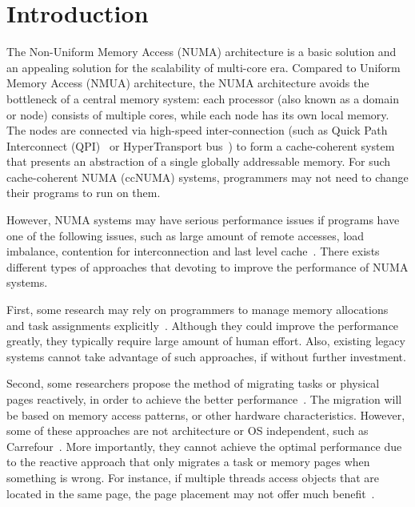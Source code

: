 
\section{Introduction}
\label{sec:intro}

The Non-Uniform Memory Access (NUMA) architecture is a basic solution and an appealing solution for the scalability of multi-core era. Compared to Uniform Memory Access (NMUA) architecture, the NUMA architecture avoids the bottleneck of a central memory system: each processor (also known as a domain or node) consists of multiple cores, while each node has its own local memory. The nodes are connected via high-speed inter-connection (such as Quick Path Interconnect (QPI)~\cite{intelqpi} or HyperTransport bus~\cite{hypertransport}) to form a cache-coherent system that presents an abstraction of a single globally addressable memory. For such cache-coherent NUMA (ccNUMA) systems, programmers may not need to change their programs to run on them. 

However, NUMA systems may have serious performance issues if programs have one of the following issues, such as large amount of remote accesses, load imbalance, contention for interconnection and last level cache~\cite{Blagodurov:2011:CNC:2002181.2002182, Dashti:2013:TMH:2451116.2451157}. There exists different types of approaches that devoting to improve the performance of NUMA systems. 

First, some research may rely on programmers to manage memory allocations and task assignments explicitly~\cite{Zhang:2015:NGA:2688500.2688507, Kaestle:2015:SSA:2813767.2813787, Lin:2016:MTP:2872362.2872401, Majo:2017:LPC:3057718.3040222}. Although they could improve the performance greatly, they typically require large amount of human effort. Also, existing legacy systems cannot take advantage of such approaches, if without further investment.  

Second, some researchers propose the method of migrating tasks or physical pages reactively, in order to achieve the better performance~\cite{Blagodurov:2011:CNC:2002181.2002182, AutoNUMA, Dashti:2013:TMH:2451116.2451157, Lepers:2015:TMP:2813767.2813788}. The migration will be based on memory access patterns, or other hardware characteristics. However, some of these approaches are not architecture or OS independent, such as Carrefour~\cite{Dashti:2013:TMH:2451116.2451157}. More importantly, they cannot achieve the optimal performance due to the reactive approach that only migrates a task or memory pages when something is wrong. For instance, if multiple threads access objects that are located in the same page, the page placement may not offer much benefit~\cite{Gaud:2014:LPM:2643634.2643659}. 


